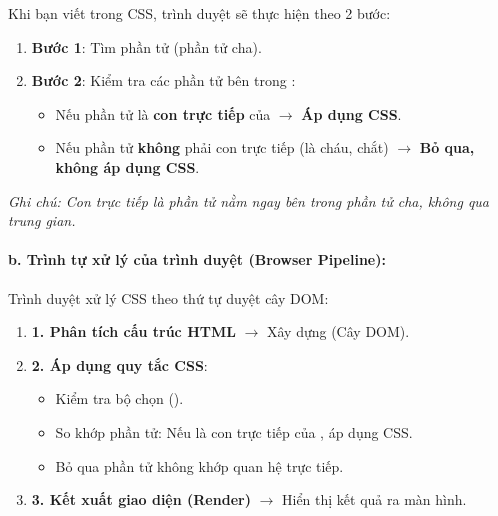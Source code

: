 \begin{noteBox}
Khi bạn viết  trong CSS, trình duyệt sẽ thực hiện theo 2 bước:
\begin{enumerate}[leftmargin=1.5em, itemsep=3pt, parsep=0pt]
    \item \textbf{Bước 1}: Tìm phần tử  (phần tử cha).
    \item \textbf{Bước 2}: Kiểm tra các phần tử bên trong :
    \begin{itemize}[leftmargin=1.2em, itemsep=2pt, parsep=0pt]
        \item Nếu phần tử  là \textbf{con trực tiếp} của  $\rightarrow$ \textcolor{tipBorder}{\textbf{Áp dụng CSS}}.
        \item Nếu phần tử  \textbf{không} phải con trực tiếp (là cháu, chắt) $\rightarrow$ \textcolor{warnBorder}{\textbf{Bỏ qua, không áp dụng CSS}}.
    \end{itemize}
\end{enumerate}
\textit{Ghi chú: Con trực tiếp là phần tử nằm ngay bên trong phần tử cha, không qua trung gian.}
\end{noteBox}

\paragraph{b. Trình tự xử lý của trình duyệt (Browser Pipeline):}

\begin{conceptBox}
Trình duyệt xử lý CSS theo thứ tự duyệt cây DOM:
\begin{enumerate}[leftmargin=1.5em, itemsep=3pt, parsep=0pt]
    \item \textbf{1. Phân tích cấu trúc HTML} $\rightarrow$ Xây dựng  (Cây DOM).
    \item \textbf{2. Áp dụng quy tắc CSS}:
    \begin{itemize}[leftmargin=1.2em, itemsep=2pt, parsep=0pt]
        \item Kiểm tra bộ chọn ().
        \item So khớp phần tử: Nếu  là con trực tiếp của , áp dụng CSS.
        \item Bỏ qua phần tử không khớp quan hệ trực tiếp.
    \end{itemize}
    \item \textbf{3. Kết xuất giao diện (Render)} $\rightarrow$ Hiển thị kết quả ra màn hình.
\end{enumerate}
\end{conceptBox}

